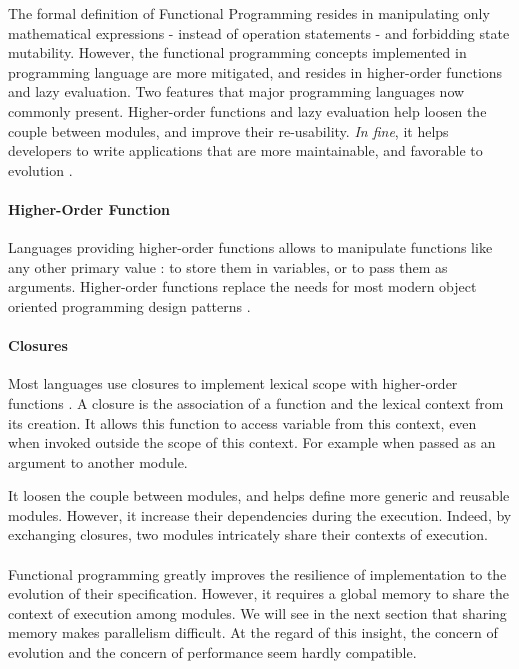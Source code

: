 
The formal definition of Functional Programming resides in manipulating only mathematical expressions - instead of operation statements - and forbidding state mutability.
However, the functional programming concepts implemented in programming language are more mitigated, and resides in higher-order functions and lazy evaluation.
Two features that major programming languages now commonly present.
Higher-order functions and lazy evaluation help loosen the couple between modules, and improve their re-usability.
\textit{In fine}, it helps developers to write applications that are more maintainable, and favorable to evolution \cite{Hughes1989}.

\paragraph{Higher-Order Function}

Languages providing higher-order functions allows to manipulate functions like any other primary value : to store them in variables, or to pass them as arguments.
Higher-order functions replace the needs for most modern object oriented programming design patterns .

\paragraph{Closures}

Most languages use closures to implement lexical scope with higher-order functions \cite{Sussman1998}.
A closure is the association of a function and the lexical context from its creation.
It allows this function to access variable from this context, even when invoked outside the scope of this context.
For example when passed as an argument to another module.

It loosen the couple between modules, and helps define more generic and reusable modules.
However, it increase their dependencies during the execution.
Indeed, by exchanging closures, two modules intricately share their contexts of execution.

\paragraph{}

Functional programming greatly improves the resilience of implementation to the evolution of their specification.
However, it requires a global memory to share the context of execution among modules.
We will see in the next section that sharing memory makes parallelism difficult.
At the regard of this insight, the concern of evolution and the concern of performance seem hardly compatible.


